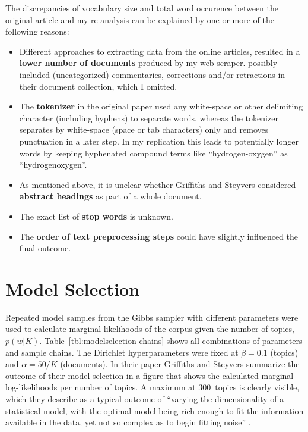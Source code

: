 The discrepancies of vocabulary size and total word occurence between the original article and my re-analysis can be explained by one or more of the following reasons:
\begin{itemize}
\item Different approaches to extracting data from the  online articles, resulted in a \textbf{lower number of documents} produced by my web-scraper. \citeauthor{Griffiths2004} possibly included (uncategorized) commentaries, corrections and/or retractions in their document collection, which I omitted.
\item The \textbf{tokenizer} in the original paper used any white-space or other delimiting character (including hyphens) to separate words, whereas the  tokenizer separates by white-space (space or tab characters) only and removes punctuation in a later step. In my replication this leads to potentially longer words by keeping hyphenated compound terms like   ``hydrogen-oxygen'' as ``hydrogenoxygen''.
\item As mentioned above, it is unclear whether Griffiths and Steyvers considered \textbf{abstract headings }as part of a whole document.
\item The exact list of \textbf{stop words} is unknown.
\item The \textbf{order of text preprocessing steps} could have slightly influenced the final outcome.
\end{itemize}






\section{Model Selection}

Repeated model samples from the Gibbs sampler with different parameters were used to calculate marginal likelihoods of the corpus given the number of topics, $p(w|K)$. Table~\ref{tbl:modelselection-chains} shows all combinations of parameters and sample chains. The Dirichlet hyperparameters were fixed at $\beta=0.1$ (topics) and $\alpha=50/K$ (documents). In their paper Griffiths and Steyvers summarize the outcome of their model selection in a figure that shows the calculated marginal log-likelihoods per number of topics. A maximum at 300~topics is clearly visible, which they describe as a typical outcome of ``varying the dimensionality of a statistical model, with the optimal model being rich enough to fit the information available in the data, yet not so complex as to begin fitting noise'' .

